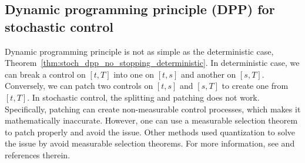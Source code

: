 \documentclass[11pt]{book}
\begin{document}
\subsection{Dynamic programming principle (DPP) for stochastic control }
Dynamic programming principle is not as simple as the deterministic case, Theorem~\ref{thm:stoch_dpp_no_stopping_deterministic}. In deterministic case, we can break a control on $[t,T]$ into one on $[t,s]$ and another on $[s,T]$. Conversely, we can patch two controls on $[t,s]$ and $[s,T]$ to create one from $[t,T]$. In stochastic control, the splitting and patching does not work. Specifically, patching can create non-measurable control processes, which makes it mathematically inaccurate. However, one can use a measurable selection theorem to patch properly and avoid the issue. Other methods used quantization  to solve the issue by avoid measurable selection theorems. For more information, see \cite{Touzi12} and references therein.
\end{document}

